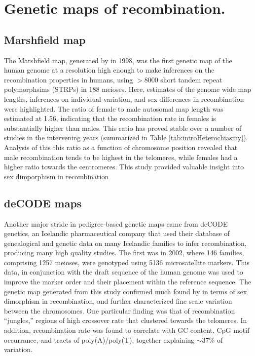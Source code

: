 \section{Genetic maps of recombination.}

\subsection{Marshfield map}
The Marshfield map, generated by \citet{Broman1998} in 1998, was the first genetic map of the human genome at a resolution high enough to make inferences on the recombination properties in humans, using $>$8000 short tandem repeat polymorphsims (STRPs) in 188 meioses.
Here, estimates of the genome wide map lengths, inferences on individual variation, and sex differences in recombination were highlighted.
The ratio of female to male autosomal map length was estimated at 1.56, indicating that the recombination rate in females is substantially higher than males.
This ratio has proved stable over a number of studies in the intervening years (summarized in Table \ref{tab:introHeterochiasmy}).
Analysis of this this ratio as a function of chromosome position revealed that male recombination tends to be highest in the telomeres, while females had a higher ratio towards the centromeres.
This study provided valuable insight into sex dimporphism in recombination

\subsection{deCODE maps}
Another major stride in pedigree-based genetic maps came from deCODE genetics, an Icelandic pharmaceutical company that used their database of genealogical and genetic data on many Icelandic families to infer recombination, producing many high quality studies.
The first was in 2002, where 146 families, comprising 1257 meioses, were genotyped using 5136 microsatellite markers\cite{Kong2002}.
This data, in conjunction with the draft sequence of the human genome\cite{Venter2001,Lander2001} was used to improve the marker order and their placement within the reference sequence.
The genetic map generated from this study confirmed much found by \citet{Broman1998} in terms of sex dimorphism in recombination, and further characterized fine scale variation between the chromosomes.
One particular finding was that of recombination ``jungles,'' regions of high crossover rate that clustered towards the telomeres.
In addition, recombination rate was found to correlate with GC content, CpG motif occurrance, and tracts of poly(A)/poly(T), together explaining $\sim$37\% of variation.

